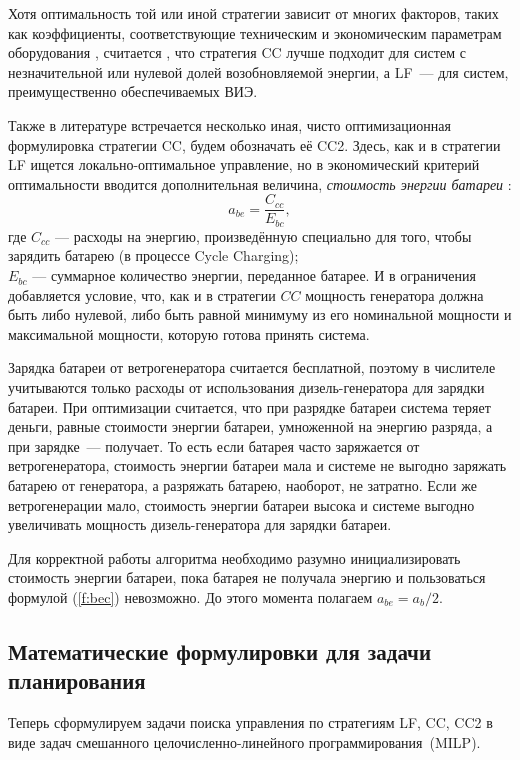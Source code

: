Хотя оптимальность той или иной стратегии зависит от многих факторов, таких как коэффициенты, соответствующие техническим и экономическим параметрам оборудования \cite[177]{Barley1996}, считается \cite{homer_control}, что стратегия CC лучше подходит для систем с незначительной или нулевой долей возобновляемой энергии, а LF~--- для систем, преимущественно обеспечиваемых ВИЭ.

Также в литературе \cite[10]{Aziz2019} встречается несколько иная, чисто оптимизационная формулировка стратегии CC,  будем обозначать её CC2. 
Здесь, как и в стратегии LF ищется локально-оптимальное управление, но в экономический критерий оптимальности вводится дополнительная величина, \textit{стоимость энергии батареи} \cite{bec}:
\begin{equation}\label{f:bec}
    a_{be} = \frac{C_{cc}}{E_{bc}},
\end{equation}
где $C_{cc}$ --- расходы на энергию, произведённую специально для того, чтобы зарядить батарею (в процессе Cycle Charging);\\
$E_{bc}$ --- суммарное количество энергии, переданное батарее.
И в ограничения добавляется условие, что, как и в стратегии $CC$ мощность генератора должна быть либо нулевой, либо быть равной минимуму из его номинальной мощности и максимальной мощности, которую готова принять система.

Зарядка батареи от ветрогенератора считается бесплатной, поэтому в числителе учитываются только расходы от использования дизель-генератора для зарядки батареи.
При оптимизации считается, что при разрядке батареи система теряет деньги, равные стоимости энергии батареи, умноженной на энергию разряда, а при зарядке~--- получает.
То есть если батарея часто заряжается от ветрогенератора, стоимость энергии батареи мала и системе не выгодно заряжать батарею от генератора, а разряжать батарею, наоборот, не затратно.
Если же ветрогенерации мало, стоимость энергии батареи высока и системе выгодно увеличивать мощность дизель-генератора для зарядки батареи.

Для корректной работы алгоритма необходимо разумно инициализировать стоимость энергии батареи, пока батарея не получала энергию и пользоваться формулой (\ref{f:bec}) невозможно.
До этого момента полагаем $a_{be} = a_b / 2$.

\subsection{Математические формулировки для задачи планирования}
\label{sec:planning_math}
Теперь сформулируем задачи поиска управления по стратегиям LF, CC, CC2 в виде задач смешанного целочисленно-линейного программирования~(MILP).


